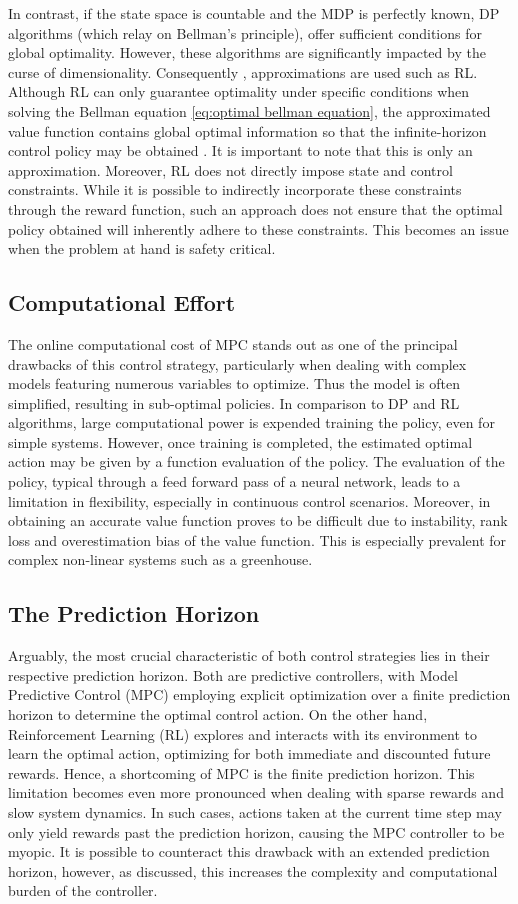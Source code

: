 In contrast, if the state space is countable and the MDP is perfectly known, DP algorithms (which relay on Bellman's principle), offer sufficient conditions for global optimality. However, these algorithms are significantly impacted by the curse of dimensionality. Consequently , approximations are used such as RL. 
Although RL can only guarantee optimality under specific conditions when solving the Bellman equation \autoref{eq:optimal bellman equation}, the approximated value function contains global optimal information so that the infinite-horizon control policy may be obtained \cite{linReinforcementLearningBasedModel2023}. It is important to note that this is only an approximation. Moreover, RL does not directly impose state and control constraints. While it is possible to indirectly incorporate these constraints through the reward function, such an approach does not ensure that the optimal policy obtained will inherently adhere to these constraints. This becomes an issue when the problem at hand is safety critical.
\subsection{Computational Effort}
 The online computational cost of MPC stands out as one of the principal drawbacks of this control strategy, particularly when dealing with complex models featuring numerous variables to optimize. Thus the model is often simplified, resulting in sub-optimal policies. In comparison to DP and RL algorithms, large computational power is expended training the policy, even for simple systems. However, once training is completed, the estimated optimal action may be given by a function evaluation of the policy. The evaluation of the policy, typical through a feed forward pass of a neural network, leads to a limitation in flexibility, especially in continuous control scenarios. Moreover, in obtaining an accurate value function proves to be difficult due to instability, rank loss and overestimation bias of the value function. This is especially prevalent for complex non-linear systems such as a greenhouse.
 
\subsection{The Prediction Horizon}
Arguably, the most crucial characteristic of both control strategies lies in their respective prediction horizon. Both are predictive controllers, with Model Predictive Control (MPC) employing explicit optimization over a finite prediction horizon to determine the optimal control action. On the other hand, Reinforcement Learning (RL) explores and interacts with its environment to learn the optimal action, optimizing for both immediate and discounted future rewards.
Hence, a shortcoming of MPC is the finite prediction horizon. This limitation becomes even more pronounced when dealing with sparse rewards and slow system dynamics. In such cases, actions taken at the current time step may only yield rewards past the prediction horizon, causing the MPC controller to be myopic. It is possible to counteract this drawback with an extended prediction horizon, however, as discussed, this increases the complexity and computational burden of the controller.

